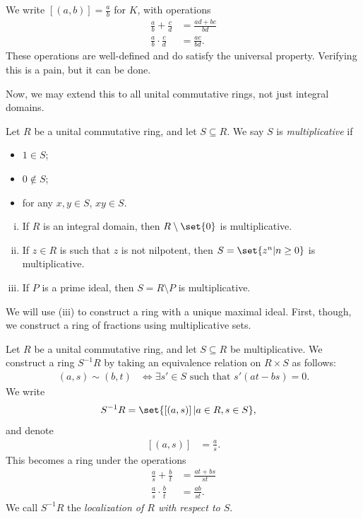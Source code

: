 \documentclass[10pt]{mypackage}
\begin{document}
We write $ \left[ \left( a,b \right) \right] = \frac{a}{b} $ for $K$, with operations
\begin{align*}
  \frac{a}{b} + \frac{c}{d} &= \frac{ad + bc}{bd}\\
  \frac{a}{b}\cdot \frac{c}{d} &= \frac{ac}{bd}.
\end{align*}
These operations are well-defined and do satisfy the universal property. Verifying this is a pain, but it can be done.%

Now, we may extend this to all unital commutative rings, not just integral domains.
\begin{definition}
  Let $R$ be a unital commutative ring, and let $S\subseteq R$. We say $S$ is \textit{multiplicative} if
  \begin{itemize}
    \item $1\in S$;
    \item $0\notin S$;
    \item for any $x,y\in S$, $xy\in S$.
  \end{itemize}
\end{definition}
\begin{example}\hfill
  \begin{enumerate}[(i)]
    \item If $R$ is an integral domain, then $R\setminus \set{0}$ is multiplicative.
    \item If $z\in R$ is such that $z$ is not nilpotent, then $S = \set{z^{n} | n\geq 0}$ is multiplicative.
    \item If $P$ is a prime ideal, then $S = R\setminus P$ is multiplicative.
  \end{enumerate}
\end{example}
We will use (iii) to construct a ring with a unique maximal ideal. First, though, we construct a ring of fractions using multiplicative sets.
\begin{definition}
  Let $R$ be a unital commutative ring, and let $S\subseteq R$ be multiplicative. We construct a ring $S^{-1}R$ by taking an equivalence relation on $R\times S$ as follows:
  \begin{align*}
    \left( a,s \right)\sim \left( b,t \right) &\Leftrightarrow \exists s'\in S\text{ such that }s'\left( at-bs \right) = 0.
  \end{align*}
  We write
  \begin{align*}
    S^{-1}R &= \set{\left[ \left( a,s \right) \right] | a\in R,s\in S},
  \end{align*}
  and denote
  \begin{align*}
    \left[ \left( a,s \right) \right] &= \frac{a}{s}.
  \end{align*}
  This becomes a ring under the operations
  \begin{align*}
    \frac{a}{s} + \frac{b}{t} &= \frac{at + bs}{st}\\
    \frac{a}{s}\cdot \frac{b}{t} &= \frac{ab}{st}.
  \end{align*}
  We call $S^{-1}R$ the \textit{localization of $R$ with respect to $S$}.
\end{definition}
\end{document}
